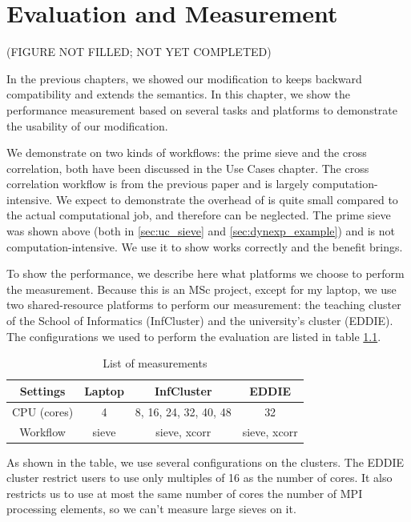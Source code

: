 \chapter{Evaluation and Measurement}
(FIGURE NOT FILLED; NOT YET COMPLETED)

In the previous chapters, we showed our modification to \dpy keeps backward compatibility and extends the semantics. In this chapter, we show the performance measurement based on several tasks and platforms to demonstrate the usability of our modification.

We demonstrate on two kinds of workflows: the prime sieve and the cross correlation, both have been discussed in the Use Cases chapter. The cross correlation workflow is from the previous \dpy paper and is largely computation-intensive. We expect to demonstrate the overhead of \tincdep is quite small compared to the actual computational job, and therefore can be neglected. The prime sieve was shown above (both in \ref{sec:uc_sieve} and \ref{sec:dynexp_example}) and is not computation-intensive. We use it to show \tdynexp works correctly and the benefit \tdynexp brings.

To show the performance, we describe here what platforms we choose to perform the measurement. Because this is an MSc project, except for my laptop, we use two shared-resource platforms to perform our measurement: the teaching cluster of the School of Informatics (InfCluster) and the university's cluster (EDDIE). The configurations we used to perform the evaluation are listed in table \ref{tbl:list_measurement}.

\begin{table}[h]
\centering
\begin{tabular}{|c|c|c|c|}
\hline
Settings & Laptop & InfCluster & EDDIE \\ \hline
CPU (cores) & 4 & 8, 16, 24, 32, 40, 48 & 32 \\ \hline
Workflow & sieve & sieve, xcorr & sieve, xcorr \\ \hline
\end{tabular}
\caption{List of measurements}
\label{tbl:list_measurement}
\end{table}

As shown in the table, we use several configurations on the clusters. The EDDIE cluster restrict users to use only multiples of 16 as the number of cores. It also restricts us to use at most the same number of cores the number of MPI processing elements, so we can't measure large sieves on it.

